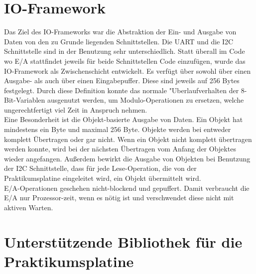 \section{IO-Framework}
Das Ziel des IO-Frameworks war die Abstraktion der Ein- und Ausgabe von Daten von den zu Grunde liegenden Schnittstellen.
Die UART und die I2C Schnittstelle sind in der Benutzung sehr unterschiedlich. Statt überall im Code wo E/A stattfindet
jeweils für beide Schnittstellen Code einzufügen, wurde das IO-Framework als Zwischenschicht entwickelt. Es verfügt über sowohl
über einen Ausgabe- als auch über einen Eingabepuffer. Diese sind jeweils auf 256 Bytes festgelegt. Durch diese Definition
konnte das normale "Uberlaufverhalten der 8-Bit-Variablen ausgenutzt werden, um Modulo-Operationen zu ersetzen, welche
ungerechtfertigt viel Zeit in Anspruch nehmen.\\
Eine Besonderheit ist die Objekt-basierte Ausgabe von Daten. Ein Objekt hat mindestens ein Byte und maximal 256 Byte. Objekte
werden bei entweder komplett Übertragen oder gar nicht. Wenn ein Objekt nicht komplett übertragen werden konnte, wird bei der
nächsten Übertragen vom Anfang der Objektes wieder angefangen. Außerdem bewirkt die Ausgabe von Objekten bei Benutzung der I2C 
Schnittstelle, dass für jede Lese-Operation, die von der Praktikumsplatine eingeleitet wird, ein Objekt übermittelt wird.\\
E/A-Operationen geschehen nicht-blockend und gepuffert. Damit verbraucht die E/A nur Prozessor-zeit, wenn es nötig ist und
verschwendet diese nicht mit aktiven Warten.
\section{Unterstützende Bibliothek für die Praktikumsplatine}
